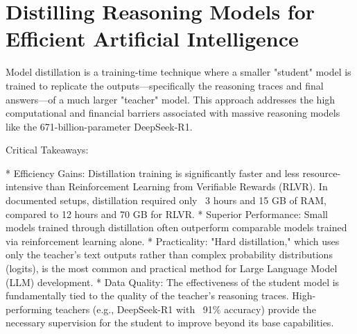 ﻿%
\chapter{Distilling Reasoning Models for Efficient Artificial Intelligence}
\label{ch:conclusion-and-future-work}

Model distillation is a training-time technique where a smaller "student" model is trained to replicate the outputs—specifically the reasoning traces and final answers—of a much larger "teacher" model. This approach addresses the high computational and financial barriers associated with massive reasoning models like the 671-billion-parameter DeepSeek-R1.

Critical Takeaways:

* Efficiency Gains: Distillation training is significantly faster and less resource-intensive than Reinforcement Learning from Verifiable Rewards (RLVR). In documented setups, distillation required only ~3 hours and 15 GB of RAM, compared to 12 hours and 70 GB for RLVR.
* Superior Performance: Small models trained through distillation often outperform comparable models trained via reinforcement learning alone.
* Practicality: "Hard distillation," which uses only the teacher’s text outputs rather than complex probability distributions (logits), is the most common and practical method for Large Language Model (LLM) development.
* Data Quality: The effectiveness of the student model is fundamentally tied to the quality of the teacher’s reasoning traces. High-performing teachers (e.g., DeepSeek-R1 with ~91\% accuracy) provide the necessary supervision for the student to improve beyond its base capabilities.





